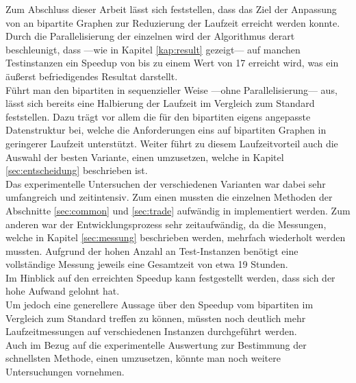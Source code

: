 



Zum Abschluss dieser Arbeit lässt sich feststellen, dass das Ziel 
der Anpassung von \gc{} an bipartite Graphen zur Reduzierung der Laufzeit erreicht werden konnte.
\\

Durch die Parallelisierung der einzelnen  wird der Algorithmus derart beschleunigt, dass ---wie
in Kapitel \ref{kap:result} gezeigt--- auf manchen Testinstanzen ein
Speedup von bis zu einem Wert von 17 erreicht wird, was ein äußerst befriedigendes Resultat darstellt. 
\\

Führt man den bipartiten \gc{} in sequenzieller Weise ---ohne Parallelisierung--- aus, lässt 
sich bereits eine Halbierung der Laufzeit im Vergleich zum Standard \cb{} feststellen.
Dazu trägt vor allem die 
für den bipartiten \gc{} eigens angepasste Datenstruktur bei, welche die Anforderungen eins  auf bipartiten
Graphen in geringerer Laufzeit unterstützt. 
Weiter führt zu diesem Laufzeitvorteil auch die Auswahl der besten Variante, 
einen \ct{} umzusetzen, welche in Kapitel \ref{sec:entscheidung} beschrieben ist.
\\

Das experimentelle Untersuchen der verschiedenen Varianten war dabei sehr umfangreich und zeitintensiv.
Zum einen mussten die einzelnen Methoden der Abschnitte \ref{sec:common} und \ref{sec:trade} aufwändig in \cpp{}
implementiert werden. Zum anderen war der Entwicklungsprozess sehr zeitaufwändig, 
da die Messungen, welche in Kapitel \ref{sec:messung} beschrieben
werden, mehrfach wiederholt werden mussten.
Aufgrund der hohen Anzahl an Test-Instanzen  benötigt eine vollständige Messung jeweils eine Gesamtzeit 
von etwa 19 Stunden. 
\\

Im Hinblick auf den erreichten Speedup kann festgestellt werden, dass sich der hohe Aufwand 
gelohnt hat.
\\

Um jedoch eine generellere Aussage über den Speedup vom bipartiten \gc{} im Vergleich zum Standard  \gc{}
 treffen zu können, müssten noch deutlich mehr Laufzeitmessungen auf verschiedenen Instanzen
durchgeführt werden.
\\

Auch im Bezug auf die experimentelle Auswertung zur Bestimmung der schnellsten Methode, 
einen \ct{} umzusetzen, könnte man noch weitere Untersuchungen vornehmen.
\\
\\

